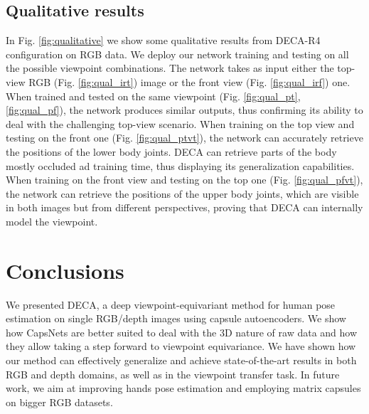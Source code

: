 \documentclass[10pt,twocolumn,letterpaper]{article}
\begin{document}
\subsection{Qualitative results}
In Fig. \ref{fig:qualitative} we show some qualitative results from DECA-R4 configuration on RGB data. We deploy our network training and testing on all the possible viewpoint combinations. The network takes as input either the top-view RGB (Fig. \ref{fig:qual_irt}) image or the front view (Fig. \ref{fig:qual_irf}) one. When trained and tested on the same viewpoint (Fig. \ref{fig:qual_pt}, \ref{fig:qual_pf}), the network produces similar outputs, thus confirming its ability to deal with the challenging top-view scenario. When training on the top view and testing on the front one (Fig. \ref{fig:qual_ptvt}), the network can accurately retrieve the positions of the lower body joints. DECA can retrieve parts of the body mostly occluded ad training time, thus displaying its generalization capabilities. When training on the front view and testing on the top one (Fig. \ref{fig:qual_pfvt}), the network can retrieve the positions of the upper body joints, which are visible in both images but from different perspectives, proving that DECA can internally model the viewpoint.

\section{Conclusions}
\label{sec:conclusions}

We presented DECA, a deep viewpoint-equivariant method for human pose estimation on single RGB/depth images using capsule autoencoders. We show how CapsNets are better suited to deal with the 3D nature of raw data and how they allow taking a step forward to viewpoint equivariance. We have shown how our method can effectively generalize and achieve state-of-the-art results in both RGB and depth domains, as well as in the viewpoint transfer task. 
In future work, we aim at improving hands pose estimation and employing matrix capsules on bigger RGB datasets.




{\small


}
\end{document}
